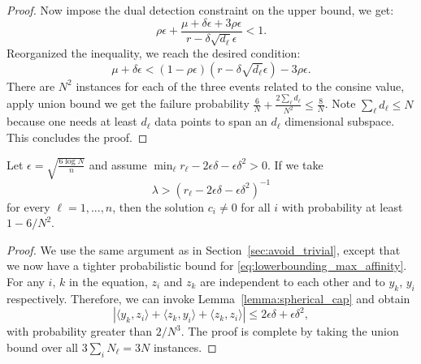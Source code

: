 \documentclass[twoside,11pt]{article}
\numberwithin{equation}{section}
\begin{document}
\begin{proof}
  Now impose the dual detection constraint on the upper bound, we get:
  $$ \rho\epsilon + \frac{\mu +\delta\epsilon + 3\rho\epsilon}{r-\delta\sqrt{d_\ell}\epsilon} < 1.$$
  Reorganized the inequality, we reach the desired condition:
  $$ \mu  +\delta\epsilon< (1-\rho\epsilon)(r-\delta\sqrt{d_{\ell}}\epsilon)  -3\rho\epsilon. $$
  There are $N^2$ instances for each of the three events related to the consine value, apply union bound we get the failure probability $\frac{6}{N}+\frac{2\sum_{\ell}{d_{\ell}}}{N^2} \leq \frac{8}{N}$. Note $\sum_{\ell} d_{\ell} \leq N$ because one needs at least $d_{\ell}$ data points to span an $d_{\ell}$ dimensional subspace. This concludes the proof.
\end{proof}



\begin{lemma}\label{lemma:avoid_trivial_random}
Let $\epsilon = \sqrt{\frac{6\log N}{n}}$ and assume $\min_\ell r_\ell - 2\epsilon\delta-\epsilon\delta^2>0$.  If we take
\begin{equation}\label{eq:avoid_trivial_random}
\lambda > (r_\ell - 2\epsilon\delta-\epsilon\delta^2)^{-1}
 \end{equation}
 for every $\ell=1,...,n$, then the solution $c_i\neq 0$ for all $i$ with probability at least $1-6/N^2$.
\end{lemma}
\begin{proof}
We use the same argument as in Section~\ref{sec:avoid_trivial}, except that we now have a tighter probabilistic bound for \eqref{eq:lowerbounding_max_affinity}. For any $i$, $k$ in the equation, $z_i$ and $z_k$ are independent to each other and to $y_k$, $y_i$ respectively. Therefore, we can invoke Lemma~\ref{lemma:spherical_cap} and obtain
$$\left|\langle y_k, z_i\rangle + \langle z_k, y_i\rangle + \langle z_k, z_i\rangle\right| \leq 2\epsilon \delta + \epsilon \delta^2,$$
with probability greater than $2/N^3$.
The proof is complete by taking the union bound over all $3 \sum_i N_\ell = 3N$ instances.
\end{proof}
\end{document}
